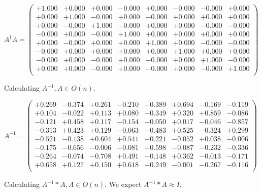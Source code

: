 \documentclass[9pt]{article}
\theoremstyle{plain}
\theoremstyle{definition}
\theoremstyle{remark}
\numberwithin{equation}{section}
\begin{document}
$A^{\dag} A = \left(
\begin{array}{
cccccccc}
+1.000 & +0.000 & +0.000 & -0.000 & +0.000 & -0.000 & -0.000 & +0.000 \\
+0.000 & +1.000 & -0.000 & +0.000 & -0.000 & +0.000 & +0.000 & +0.000 \\
+0.000 & -0.000 & +1.000 & -0.000 & +0.000 & +0.000 & -0.000 & -0.000 \\
-0.000 & +0.000 & -0.000 & +1.000 & +0.000 & +0.000 & +0.000 & +0.000 \\
+0.000 & -0.000 & +0.000 & +0.000 & +1.000 & +0.000 & -0.000 & -0.000 \\
-0.000 & +0.000 & +0.000 & +0.000 & +0.000 & +1.000 & +0.000 & +0.000 \\
-0.000 & +0.000 & -0.000 & +0.000 & -0.000 & +0.000 & +1.000 & -0.000 \\
+0.000 & +0.000 & -0.000 & +0.000 & -0.000 & +0.000 & -0.000 & +1.000 \\
\end{array}
\right)$ \newline 

Calculating $A^{-1} ,  A \in O(n)$.

$A^{-1} = \left(
\begin{array}{
cccccccc}
+0.269 & -0.374 & +0.261 & -0.210 & -0.389 & +0.694 & -0.169 & -0.119 \\
+0.104 & -0.022 & +0.113 & +0.080 & +0.349 & +0.320 & +0.859 & -0.086 \\
-0.121 & +0.458 & +0.117 & -0.154 & -0.050 & +0.017 & -0.046 & -0.857 \\
-0.313 & +0.423 & +0.129 & -0.063 & +0.483 & +0.525 & -0.324 & +0.299 \\
-0.521 & -0.138 & +0.604 & +0.541 & -0.221 & -0.052 & +0.038 & -0.006 \\
-0.175 & -0.656 & -0.006 & -0.081 & +0.598 & -0.087 & -0.232 & -0.336 \\
-0.264 & -0.074 & -0.708 & +0.491 & -0.148 & +0.362 & -0.013 & -0.171 \\
+0.658 & +0.127 & +0.150 & +0.618 & +0.249 & -0.001 & -0.267 & -0.116 \\
\end{array}
\right)$ \newline 

Calculating $A^{-1} *A  ,  A \in O(n)$.   We expect $A^{-1} *A  \approx I$. 
\end{document}

